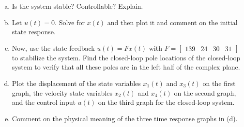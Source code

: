 \documentclass{article}
\begin{document}
\begin{enumerate}[(a)]
\item Is the system stable? Controllable? Explain.
\newline
\newline

\item Let $u(t) = 0$. Solve for $x(t)$ and then plot it and comment on the initial state response.
\newline
\newline

\item Now, use the state feedback $u(t) = Fx(t)$ with $F = \begin{bmatrix} 139 & 24 & 30 & 31 \end{bmatrix}$ to stabilize the system.
Find the closed-loop pole locations of the closed-loop system to verify that all these poles are in the left half of the complex plane.
\newline
\newline

\item Plot the displacement of the state variables $x_1(t)$ and $x_3(t)$ on the first graph, the velocity state variables $x_2(t)$ and $x_4(t)$ on the second graph, and the control input $u(t)$ on the third graph for the closed-loop system.
\newline
\newline

\item Comment on the physical meaning of the three time response graphs in (d).
\newline
\newline

\end{enumerate}

\newpage
\end{document}
